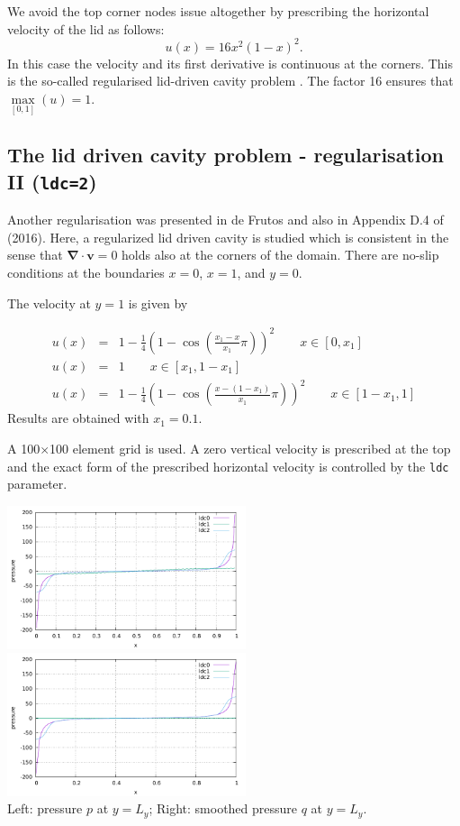 We avoid the top corner nodes issue altogether by  
prescribing the horizontal velocity of the lid as follows: 
\begin{equation}
u(x)=16x^2(1-x)^2.
\end{equation}
In this case the velocity and its first derivative is continuous at the corners. This is the so-called regularised lid-driven cavity problem \cite{piva94}. The factor 16 ensures that $\max\limits_{[0,1]}(u)=1$.
 
\subsection*{The lid driven cavity problem - regularisation II ({\tt ldc=2})}

Another regularisation was presented in de Frutos \etal \cite{dejn16} and 
also in Appendix D.4 of \textcite{john16} (2016). 
Here, a regularized lid driven cavity is studied which is consistent in the sense that 
${\bm \nabla}\cdot{\bm v}=0$ 
holds also at the corners of the domain.
There are no-slip conditions at the boundaries $x=0$, $x=1$, and $y=0$. 

The velocity at $y=1$ is given by

\begin{eqnarray}
u(x) &=& 1-\frac{1}{4}\left( 1-\cos (\frac{x_1-x}{x_1}\pi)  \right)^2   \quad\quad x\in[0,x_1] \nonumber\\
u(x) &=& 1 \quad\quad x\in[x_1,1-x_1] \nonumber\\
u(x) &=& 1-\frac{1}{4}\left( 1-\cos (\frac{x-(1-x_1)}{x_1}\pi)  \right)^2   \quad\quad x\in[1-x_1,1]
\end{eqnarray}
Results are obtained with $x_1=0.1$.

\newpage
A 100$\times$100 element grid is used. 
A zero vertical velocity is prescribed at the top and the exact form of the 
prescribed horizontal velocity is controlled by the {\tt ldc} parameter.

\begin{center}
\includegraphics[width=7cm]{python_codes/fieldstone_04/results/p.pdf}
\includegraphics[width=7cm]{python_codes/fieldstone_04/results/q.pdf}\\
{\captionfont Left: pressure $p$ at $y=L_y$; Right: smoothed pressure $q$ at $y=L_y$.}
\end{center}

